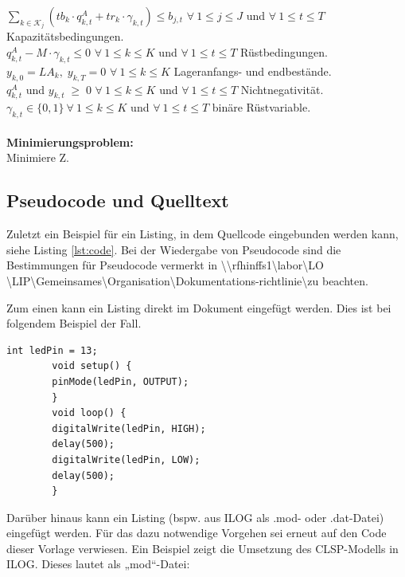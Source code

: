 \documentclass[13pt,a4paper, listof=entryprefix, bibliography=totocnumbered,toc=listofnumbered,lof=listofnumbered]{scrartcl}
\begin{document}
$\sum\limits_{k \in \mathcal{K}_{j}}(tb_{k}\cdot q^{A}_{k,t} + tr_{k}\cdot \gamma_{k,t})\le b_{j,t}$ $ \forall \ 1 \le j \le J $ und $\forall \ 1 \le t \le T $ \hfill Kapazitätsbedingungen. \\
$q^{A}_{k,t} - M \cdot \gamma_{k,t} \le 0$ $ \forall \ 1 \le k \le K $ und $\forall \ 1 \le t \le T $ \hfill Rüstbedingungen. \\
$y_{k,0} = LA_{k},\; y_{k,T} = 0 $ $ \forall \ 1 \le k \le K $  \hfill Lageranfangs- und endbestände. \\
$q^{A}_{k,t}$ und $y_{k,t} \;\ge\; 0$   $ \forall \ 1 \le k \le K $ und $\forall \ 1 \le t \le T $ \hfill Nichtnegativität. \\
$\gamma_{k,t} \in \{0,1\} ~\forall \ 1 \le k \le K $ und $\forall \ 1 \le t \le T $ \hfill binäre Rüstvariable.\\
\\[0,5em]
\textbf{Minimierungsproblem:} \\
Minimiere Z.


\subsection{Pseudocode und Quelltext}
\label{ch:code}
Zuletzt ein Beispiel für ein Listing, in dem Quellcode eingebunden werden kann, siehe Listing \ref{lst:code}. Bei der Wiedergabe von Pseudocode sind die Bestimmungen für Pseudocode vermerkt in
\textbackslash\textbackslash rfhinffs1\textbackslash labor\textbackslash LO \textbackslash LIP\textbackslash Gemeinsames\textbackslash Organisation\textbackslash Dokumentations-richtlinie\textbackslash zu beachten.

Zum einen kann ein Listing direkt im Dokument eingefügt werden. Dies ist bei folgendem Beispiel der Fall.
\vspace{1em}
\begin{lstlisting}[caption= Beispielprogramm., label=lst:code]
		int ledPin = 13;
		void setup() {
		pinMode(ledPin, OUTPUT);
		}
		void loop() {
		digitalWrite(ledPin, HIGH);
		delay(500);
		digitalWrite(ledPin, LOW);
		delay(500);
		}
		\end{lstlisting}

Darüber hinaus kann ein Listing (bspw. aus ILOG als .mod- oder .dat-Datei) eingefügt werden. Für das dazu notwendige Vorgehen sei erneut auf den Code dieser Vorlage verwiesen. Ein Beispiel zeigt die Umsetzung des CLSP-Modells in ILOG. Dieses lautet als „mod“-Datei:\\

\end{document}
